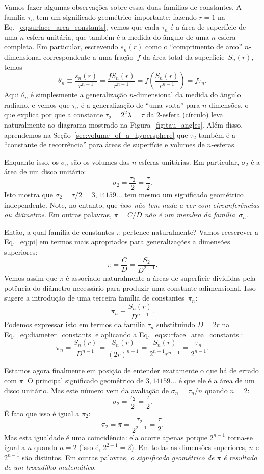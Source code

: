 Vamos fazer algumas observações sobre essas duas famílias de constantes. A família $\tau_n$ tem um significado geométrico importante: fazendo $r=1$ na Eq.~\eqref{eq:surface_area_constants}, vemos que cada $\tau_n$ é a área de superfície de uma $n$-esfera unitária, que também é a medida do ângulo de uma $n$-esfera completa. Em particular, escrevendo $s_n(r)$ como o ``comprimento de arco'' $n$-dimensional correspondente a uma fração~$f$ da área total da superfície~$S_n(r)$, temos
\[
\theta_n \equiv \frac{s_n(r)}{r^{n-1}} = \frac{f S_n(r)}{r^{n-1}} = f\left(\frac{S_n(r)}{r^{n-1}}\right) = f\tau_n.
\]
Aqui $\theta_n$ é simplesmente a generalização $n$-dimensional da medida do ângulo radiano, e vemos que $\tau_n$ é a generalização de ``uma volta'' para $n$ dimensões, o que explica por que a constante $\tau_2 = 2^2\lambda = \tau$ da 2-esfera (círculo) leva naturalmente ao diagrama mostrado na Figura~\ref{fig:tau_angles}. Além disso, aprendemos na Seção~\ref{sec:volume_of_a_hypersphere} que $\tau_2$ também é a ``constante de recorrência'' para áreas de superfície e volumes de $n$-esferas.

Enquanto isso, os $\sigma_n$ são os volumes das $n$-esferas unitárias. Em particular, $\sigma_2$ é a área de um disco unitário:
\[
\sigma_2 = \frac{\tau_2}{2} = \frac{\tau}{2}.
\]
Isto mostra que $\sigma_2 = \tau/2 = 3,14159\ldots$ tem mesmo um significado geométrico independente. Note, no entanto, que \emph{isso não tem nada a ver com circunferências ou diâmetros}. Em outras palavras, \emph{$\pi = C/D$ não é um membro da família~$\sigma_n$}.

Então, a qual família de constantes $\pi$ pertence naturalmente?
Vamos reescrever a Eq.~\eqref{eq:pi} em termos mais apropriados para generalizações a dimensões superiores:
\[
\pi = \frac{C}{D} = \frac{S_2}{D^{2-1}}.
\]
Vemos assim que $\pi$ é associado naturalmente a áreas de superfície divididas pela potência do diâmetro necessário para produzir uma constante adimensional. Isso sugere a introdução de uma terceira família de constantes~$\pi_n$:
\begin{equation}
\label{eq:diameter_constants}
\pi_n \equiv \frac{S_n(r)}{D^{n-1}}.
\end{equation}
Podemos expressar isto em termos da família $\tau_n$ substituindo $D = 2r$ na Eq.~\eqref{eq:diameter_constants} e aplicando a Eq.~\eqref{eq:surface_area_constants}:
\[
\pi_n = \frac{S_n(r)}{D^{n-1}} = \frac{S_n(r)}{(2r)^{n-1}} =
\frac{S_n(r)}{2^{n-1}r^{n-1}} = \frac{\tau_n}{2^{n-1}}.
\]

Estamos agora finalmente em posição de entender exatamente o que há de errado com $\pi$. O principal significado geométrico de $3,14159\ldots$ é que ele é a área de um disco unitário. Mas este número vem da avaliação de $\sigma_n = \tau_n/n$ quando $n=2$:
\[
\sigma_2 = \frac{\tau_2}{2} = \frac{\tau}{2}.
\]
É fato que isso é igual a $\pi_2$:
\[
\pi_2 = \pi = \frac{\tau_2}{2^{2-1}} = \frac{\tau}{2}.
\]
Mas esta igualdade é uma coincidência: ela ocorre apenas porque $2^{n-1}$ torna-se igual a $n$ quando $n=2$ (isso é, $2^{2-1} = 2$). Em todas as dimensões superiores, $n$ e $2^{n-1}$ são distintos. Em outras palavras, \emph{o significado geométrico de $\pi$ é resultado de um trocadilho matemático}.

